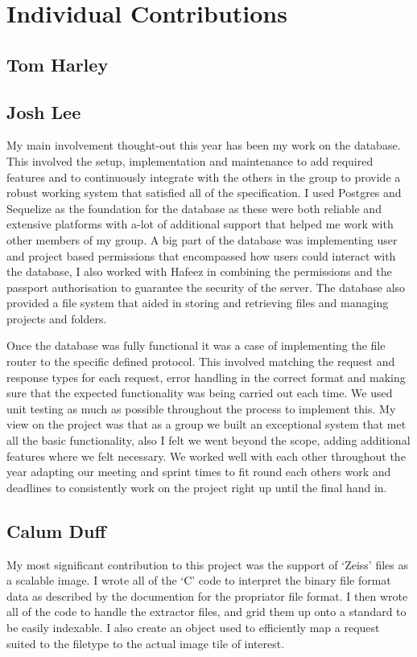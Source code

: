 \section{Individual Contributions}
\subsection{Tom Harley}
\subsection{Josh Lee}
My main involvement thought-out this year has been my work on the database. This involved the setup, implementation and maintenance to add required features and to continuously integrate with the others in the group to provide a robust working system that satisfied all of the specification. I used Postgres and Sequelize as the foundation for the database as these were both reliable and extensive platforms with a-lot of additional support that helped me work with other members of my group. A big part of the database was implementing user and project based permissions that encompassed how users could interact with the database, I also worked with Hafeez in combining the permissions and the passport authorisation to guarantee the security of the server. The database also provided a file system that aided in storing and retrieving files and managing projects and folders.

Once the database was fully functional it was a case of implementing the file router to the specific defined protocol. This involved matching the request and response types for each request, error handling in the correct format and making sure that the expected functionality was being carried out each time. We used unit testing as much as possible throughout the process to implement this. My view on the project was that as a group we built an exceptional system that met all the basic functionality, also I felt we went beyond the scope, adding additional features where we felt necessary. We worked well with each other throughout the year adapting our meeting and sprint times to fit round each others work and deadlines to consistently work on the project right up until the final hand in.
\subsection{Calum Duff}
My most significant contribution to this project was the support of `Zeiss' files as a scalable image. I wrote all of the `C' code to interpret the binary file format data as described by the documention for the propriator file format. I then wrote all of the code to handle the extractor files, and grid them up onto a standard to be easily indexable. I also create an object used to efficiently map a request suited to the filetype to the actual image tile of interest.


